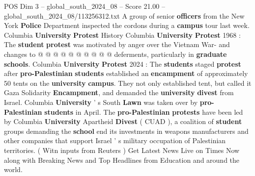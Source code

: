 \begin{textsample}{POS Dim 3 – global\_south\_2024\_08 – Score 21.00 – global\_south\_2024\_08/113256312.txt}
A group of senior \textbf{officers} from the New York \textbf{Police} Department inspected the cordons during a \textbf{campus} tour last week.
Columbia \textbf{University} \textbf{Protest} History Columbia \textbf{University} \textbf{Protest} 1968 : The \textbf{student} \textbf{protest} was motivated by anger over the Vietnam War- and changes to @ @ @ @ @ @ @ @ @ @ deferments, particularly in \textbf{graduate} \textbf{schools}.
Columbia \textbf{University} \textbf{Protest} 2024 : The \textbf{students} staged \textbf{protest} after \textbf{pro-Palestinian} \textbf{students} established an \textbf{encampment} of approximately 50 tents on the \textbf{university} \textbf{campus}.
They not only established tent, but called it Gaza Solidarity \textbf{Encampment}, and demanded the \textbf{university} \textbf{divest} from Israel.
Columbia \textbf{University} ' s South \textbf{Lawn} was taken over by \textbf{pro-Palestinian} \textbf{students} in April.
The \textbf{pro-Palestinian} \textbf{protests} have been led by Columbia \textbf{University} Apartheid \textbf{Divest} ( CUAD ), a coalition of \textbf{student} groups demanding the \textbf{school} end its investments in weapons manufacturers and other companies that support Israel ' s military occupation of Palestinian territories. ( Witn inputs from Reuters ) Get Latest News Live on Times Now along with Breaking News and Top Headlines from Education and around the world.

\end{textsample}
